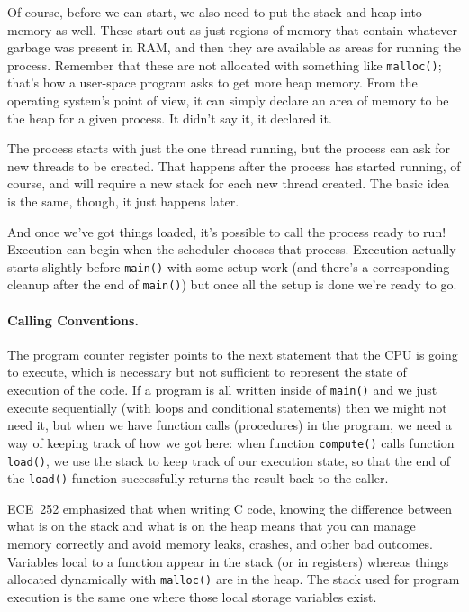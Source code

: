 Of course, before we can start, we also need to put the stack and heap into memory as well. These start out as just regions of memory that contain whatever garbage was present in RAM, and then they are available as areas for running the process. Remember that these are not allocated with something like \texttt{malloc()}; that's how a user-space program asks to get more heap memory. From the operating system's point of view, it can simply declare an area of memory to be the heap for a given process. It didn't say it, it declared it.

The process starts with just the one thread running, but the process can ask for new threads to be created. That happens after the process has started running, of course, and will require a new stack for each new thread created. The basic idea is the same, though, it just happens later.

And once we've got things loaded, it's possible to call the process ready to run! Execution can begin when the scheduler chooses that process. Execution actually starts slightly before \texttt{main()} with some setup work (and there's a corresponding cleanup after the end of \texttt{main()}) but once all the setup is done we're ready to go.

\paragraph{Calling Conventions.} 
The program counter register points to the next statement that the CPU is going to execute, which is necessary but not sufficient to represent the state of execution of the code. If a program is all written inside of \texttt{main()} and we just execute sequentially (with loops and conditional statements) then we might not need it, but when we have function calls (procedures) in the program, we need a way of keeping track of how we got here: when function \texttt{compute()} calls function \texttt{load()}, we use the stack to keep track of our execution state, so that the end of the \texttt{load()} function successfully returns the result back to the caller.

ECE~252 emphasized that when writing C code, knowing the difference between what is on the stack and what is on the heap means that you can manage memory correctly and avoid memory leaks, crashes, and other bad outcomes. Variables local to a function appear in the stack (or in registers) whereas things allocated dynamically with \texttt{malloc()} are in the heap. The stack used for program execution is the same one where those local storage variables exist.

